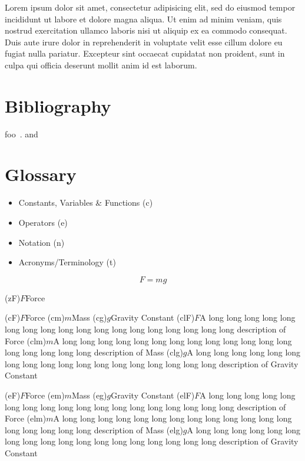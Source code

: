 \documentclass[10pt,a4paper,extrafontsizes,oldfontcommands,oneside]{memoir}
\begin{document}
Lorem ipsum dolor sit amet, consectetur adipisicing elit, sed do eiusmod tempor incididunt ut labore et dolore magna aliqua. Ut enim ad minim veniam, quis nostrud exercitation ullamco laboris nisi ut aliquip ex ea commodo consequat. Duis aute irure dolor in reprehenderit in voluptate velit esse cillum dolore eu fugiat nulla pariatur. Excepteur sint occaecat cupidatat non proident, sunt in culpa qui officia deserunt mollit anim id est laborum.


\section{Bibliography} %
\label{sec:bibliography}

foo~\citeauthor{companion}. and \cite{companion}


\section{Glossary} %
\label{sec:glossary}

\begin{itemize}
	\item Constants, Variables \& Functions (c)
	\item Operators (e)
	\item Notation (n)
	\item Acronyms/Terminology (t)
\end{itemize}

\begin{equation}
	F=mg
\end{equation}

\glossary(zF){$F$}{Force}

\glossary(cF){$F$}{Force}
\glossary(cm){$m$}{Mass}
\glossary(cg){$g$}{Gravity Constant}
\glossary(clF){$F$}{A long long long long long long long long long long long long long long long long long long description of Force}
\glossary(clm){$m$}{A long long long long long long long long long long long long long long long long long long description of Mass}
\glossary(clg){$g$}{A long long long long long long long long long long long long long long long long long long description of Gravity Constant}

\glossary(eF){$F$}{Force}
\glossary(em){$m$}{Mass}
\glossary(eg){$g$}{Gravity Constant}
\glossary(elF){$F$}{A long long long long long long long long long long long long long long long long long long description of Force}
\glossary(elm){$m$}{A long long long long long long long long long long long long long long long long long long description of Mass}
\glossary(elg){$g$}{A long long long long long long long long long long long long long long long long long long description of Gravity Constant}
\end{document}
